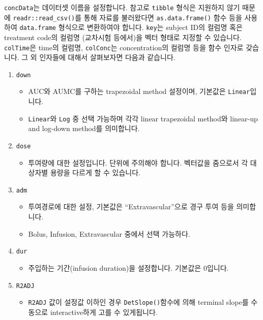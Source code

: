 \documentclass[
  12pt,
]{krantz}
\providecommand{\tightlist}{%
  \setlength{\itemsep}{0pt}\setlength{\parskip}{0pt}}
\begin{document}
\texttt{concData}는 데이터셋 이름을 설정합니다. 참고로 \texttt{tibble} 형식은 지원하지 않기 때문에
\texttt{readr::read\_csv()}를 통해 자료를 불러왔다면 \texttt{as.data.frame()} 함수 등을 사용하여 \texttt{data.frame} 형식으로 변환하여야 합니다.
\texttt{key}는 subject ID의 컬럼명 혹은 treatment code의 컬럼명 (교차시험 등에서)을 벡터 형태로 지정할 수 있습니다.
\texttt{colTime}은 time의 컬럼명, \texttt{colConc}는 concentration의 컬럼명 등을 함수 인자로 갖습니다. 그 외 인자들에 대해서 살펴보자면 다음과 같습니다.

\begin{enumerate}
\def\labelenumi{\arabic{enumi}.}
\tightlist
\item
  \texttt{down}

  \begin{itemize}
  \tightlist
  \item
    AUC와 AUMC를 구하는 trapezoidal method 설정이며, 기본값은 \texttt{Linear}입니다.
  \item
    \texttt{Linear}와 \texttt{Log} 중 선택 가능하며 각각 linear trapezoidal method와 linear-up and log-down method를 의미합니다.
  \end{itemize}
\item
  \texttt{dose}

  \begin{itemize}
  \tightlist
  \item
    투여량에 대한 설정입니다. 단위에 주의해야 합니다. 벡터값을 줌으로서 각 대상자별 용량을 다르게 할 수 있습니다.
  \end{itemize}
\item
  \texttt{adm}

  \begin{itemize}
  \tightlist
  \item
    투여경로에 대한 설정, 기본값은 ``Extravascular''으로 경구 투여 등을 의미합니다.
  \item
    Bolus, Infusion, Extravascular 중에서 선택 가능하다.
  \end{itemize}
\item
  \texttt{dur}

  \begin{itemize}
  \tightlist
  \item
    주입하는 기간(infusion duration)을 설정합니다. 기본값은 0입니다.
  \end{itemize}
\item
  \texttt{R2ADJ}

  \begin{itemize}
  \tightlist
  \item
    \texttt{R2ADJ} 값이 설정값 이하인 경우 \texttt{DetSlope()}함수에 의해 terminal slope를 수동으로 interactive하게 고를 수 있게됩니다.
  \end{itemize}
\end{enumerate}
\end{document}
